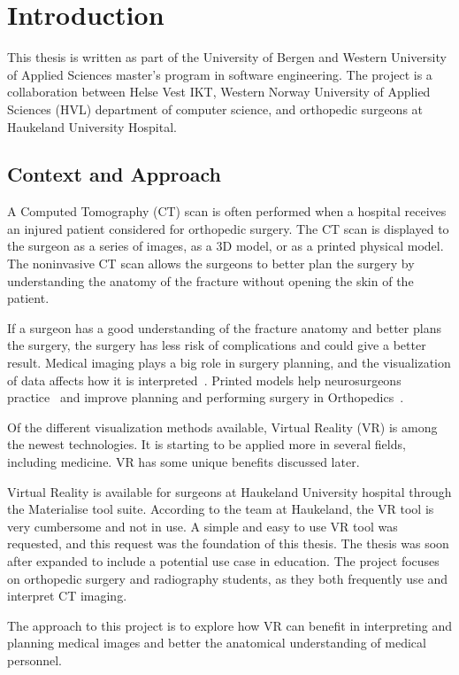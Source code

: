 \documentclass[a4paper]{report}
\begin{document}
\chapter{Introduction}
This thesis is written as part of the University of Bergen and Western University of Applied Sciences master's program in software engineering. The project is a collaboration between Helse Vest IKT, Western Norway University of Applied Sciences (HVL) department of computer science, and orthopedic surgeons at Haukeland University Hospital.

\section{Context and Approach}
A Computed Tomography (CT) scan is often performed when a hospital receives an injured patient considered for orthopedic surgery. The CT scan is displayed to the surgeon as a series of images, as a 3D model, or as a printed physical model. The noninvasive CT scan allows the surgeons to better plan the surgery by understanding the anatomy of the fracture without opening the skin of the patient.

If a surgeon has a good understanding of the fracture anatomy and better plans the surgery,
the surgery has less risk of complications and could give a better result.
Medical imaging plays a big role in surgery planning, and the visualization of data affects how it is interpreted~\cite{bradley_history_2008}.
Printed models help neurosurgeons practice~\cite{shahrubudin_overview_2019} and improve planning and performing surgery in Orthopedics~\cite{chen_efficacy_2019}.

Of the different visualization methods available, Virtual Reality (VR) is among the newest technologies. It is starting to be applied more in several fields, including medicine. VR has some unique benefits discussed later.

Virtual Reality is available for surgeons at Haukeland University hospital through the Materialise tool suite. According to the team at Haukeland, the VR tool is very cumbersome and not in use. A simple and easy to use VR tool was requested, and this request was the foundation of this thesis. The thesis was soon after expanded to include a potential use case in education. The project focuses on orthopedic surgery and radiography students, as they both frequently use and interpret CT imaging.

The approach to this project is to explore how VR can benefit in interpreting and planning medical images and better the anatomical understanding of medical personnel.
\end{document}
